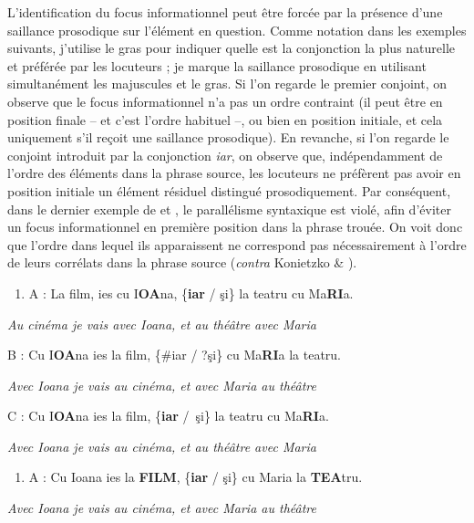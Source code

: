 L'identification du focus informationnel peut être forcée par la présence d'une saillance prosodique sur l'élément en question. Comme notation dans les exemples suivants, j'utilise le gras pour indiquer quelle est la conjonction la plus naturelle et préférée par les locuteurs ; je marque la saillance prosodique en utilisant simultanément les majuscules et le gras. Si l'on regarde le premier conjoint, on observe que le focus informationnel n'a pas un ordre contraint (il peut être en position finale -- et c'est l'ordre habituel --, ou bien en position initiale, et cela uniquement s'il reçoit une saillance prosodique). En revanche, si l'on regarde le conjoint introduit par la conjonction \textit{iar}, on observe que, indépendamment de l'ordre des éléments dans la phrase source, les locuteurs ne préfèrent pas avoir en position initiale un élément résiduel distingué prosodiquement. Par conséquent, dans le dernier exemple de  et , le parallélisme syntaxique est violé, afin d'éviter un focus informationnel en première position dans la phrase trouée. On voit donc que l'ordre dans lequel ils apparaissent ne correspond pas nécessairement à l'ordre de leurs corrélats dans la phrase source (\textit{contra} Konietzko \& \citet{Winkler2010}).  


\begin{enumerate}
\item \label{bkm:Ref289683478}A :  La film, ies cu I\textbf{OA}na, \{\textbf{iar} / şi\} la teatru cu Ma\textbf{RI}a.


\end{enumerate}
{\itshape
Au cinéma je vais avec Ioana, et au théâtre avec Maria}

  B :  Cu I\textbf{OA}na ies la film, \{\#iar / ?şi\} cu Ma\textbf{RI}a la teatru. 

{\itshape
Avec Ioana je vais au cinéma, et avec Maria au théâtre}

  C :  Cu I\textbf{OA}na ies la film, \{\textbf{iar} /~şi\} la teatru cu Ma\textbf{RI}a. 

{\itshape
    Avec Ioana je vais au cinéma, et au théâtre avec Maria } 


\begin{enumerate}
\item \label{bkm:Ref289683484}A :  Cu Ioana ies la \textbf{FILM}, \{\textbf{iar} / şi\} cu Maria la \textbf{TEA}tru.


\end{enumerate}
{\itshape
Avec Ioana je vais au cinéma, et avec Maria au théâtre}

